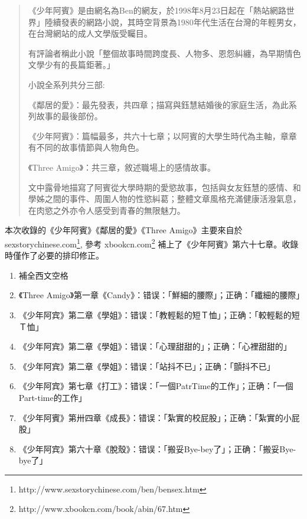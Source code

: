
\begin{quotation}
    《少年阿賓》是由網名為Ben的網友，於1998年8月23日起在「熱站網路世界」陸續發表的網路小說，其時空背景為1980年代生活在台灣的年輕男女，在台灣網站的成人文學版受矚目。

有評論者稱此小說「整個故事時間跨度長、人物多、恩怨糾纏，為早期情色文學少有的長篇鉅著。」

小說全系列共分三部:

《鄰居的愛》：最先發表，共四章；描寫與鈺慧結婚後的家庭生活，為此系列故事的最後部份。

《少年阿賓》：篇幅最多，共六十七章；以阿賓的大學生時代為主軸，章章有不同的故事情節與人物角色。

《Three Amigo》：共三章，敘述職場上的感情故事。

文中露骨地描寫了阿賓從大學時期的愛慾故事，包括與女友鈺慧的感情、和學姊之間的事件、周圍人物的性慾糾葛；整體文章風格充滿健康活潑氣息，在肉慾之外亦令人感受到青春的無限魅力。

\end{quotation}

本次收錄的《少年阿賓》《鄰居的愛》《Three Amigo》主要來自於sexstorychinese.com\footnote{http://www.sexstorychinese.com/ben/bensex.htm}, 參考 xbookcn.com\footnote{http://www.xbookcn.com/book/abin/67.htm} 補上了《少年阿賓》第六十七章。收錄時僅作了必要的排印修正。

\begin{enumerate}
\item 補全西文空格
\item 《Three Amigo》第一章《Candy》：错误：「鮮細的腰際」；正确：「纖細的腰際」
\item 《少年阿宾》第二章《學姐》：错误：「教輕鬆的短Ｔ恤」；正确：「較輕鬆的短Ｔ恤」
\item 《少年阿宾》第二章《學姐》：错误：「心理甜甜的」；正确：「心裡甜甜的」
\item 《少年阿宾》第二章《學姐》：错误：「站抖不已」；正确：「顫抖不已」
\item 《少年阿宾》第七章《打工》：错误：「一個PatrTime的工作」；正确：「一個Part-time的工作」
\item 《少年阿賓》第卅四章《成長》：错误：「紮實的校屁股」；正确：「紮實的小屁股」
\item 《少年阿宾》第六十章《脫殼》：错误：「搬妥Bye-bey了」；正确：「搬妥Bye-bye了」
\end{enumerate}
